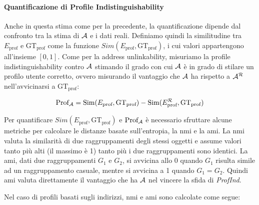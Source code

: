 \paragraph{Quantificazione di Profile Indistinguishability}\label{quantificazione-di-profile-indistinguishability}

Anche in questa stima come per la precedente, la quantificazione dipende dal confronto tra la stima di $\mathcal{A}$ e i dati reali.
Definiamo quindi la similitudine tra $E_\text{prof}$ e $\text{GT}_\text{prof}$ come la funzione $Sim(E_\text{prof}, \text{GT}_\text{prof})$, i cui valori appartengono all'insieme $[0, 1]$.
Come per la address unlinkability, misuriamo la profile indistinguishability contro $\mathcal{A}$ stimando il grado con cui $\mathcal{A}$ è in grado di stilare un profilo utente corretto, ovvero misurando il vantaggio che $\mathcal{A}$ ha rispetto a $\mathcal{A}^\mathcal{R}$ nell'avvicinarsi a $\text{GT}_\text{prof}$:

\[ \text{Prof}_{\mathcal{A}} = \text{Sim}(E_\text{prof}, \text{GT}_\text{prof}) - \text{Sim}(E^\mathcal{R}_\text{prof}, \text{GT}_\text{prof}) \]

Per quantificare $Sim(E_\text{prof}, \text{GT}_\text{prof})$ e $\text{Prof}_{\mathcal{A}}$ è necessario sfruttare alcune metriche per calcolare le distanze basate sull'entropia, la \gls{nmi} e la \gls{ami}.
La \gls{nmi} valuta la similarità di due raggruppamenti degli stessi oggetti e assume valori tanto più alti (il massimo è 1) tanto più i due raggruppamenti sono identici.
La \gls{ami}, dati due raggruppamenti $G_1$ e $G_2$, si avvicina allo 0 quando $G_1$ risulta simile ad un raggruppamento casuale, mentre si avvicina a 1 quando $G_1 = G_2$. Quindi \gls{ami} valuta direttamente il vantaggio che ha $\mathcal{A}$ nel vincere la sfida di \emph{ProfInd}.

Nel caso di profili basati sugli indirizzi, \gls{nmi} e \gls{ami} sono calcolate come segue:

